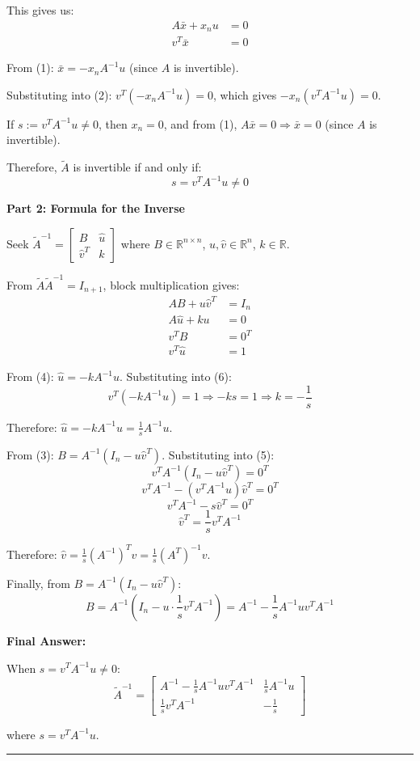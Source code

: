 This gives us:
\begin{align}
A\bar{x} + x_n u &= 0 \tag{1}\\
v^T\bar{x} &= 0 \tag{2}
\end{align}

From (1): $\bar{x} = -x_n A^{-1}u$ (since $A$ is invertible).

Substituting into (2): $v^T(-x_n A^{-1}u) = 0$, which gives $-x_n(v^T A^{-1}u) = 0$.

If $s := v^TA^{-1}u \neq 0$, then $x_n = 0$, and from (1), $A\bar{x} = 0 \Rightarrow \bar{x} = 0$ (since $A$ is invertible).

Therefore, $\tilde{A}$ is invertible if and only if:
$$\boxed{s = v^TA^{-1}u \neq 0}$$

\textbf{Part 2: Formula for the Inverse}

Seek $\tilde{A}^{-1} = \begin{bmatrix} B & \hat{u} \\ \hat{v}^T & k \end{bmatrix}$ where $B \in \mathbb{R}^{n \times n}$, $\hat{u}, \hat{v} \in \mathbb{R}^n$, $k \in \mathbb{R}$.

From $\tilde{A}\tilde{A}^{-1} = I_{n+1}$, block multiplication gives:
\begin{align}
AB + u\hat{v}^T &= I_n \tag{3}\\
A\hat{u} + ku &= 0 \tag{4}\\
v^TB &= 0^T \tag{5}\\
v^T\hat{u} &= 1 \tag{6}
\end{align}

From (4): $\hat{u} = -kA^{-1}u$. Substituting into (6):
$$v^T(-kA^{-1}u) = 1 \Rightarrow -ks = 1 \Rightarrow k = -\frac{1}{s}$$

Therefore: $\hat{u} = -kA^{-1}u = \frac{1}{s}A^{-1}u$.

From (3): $B = A^{-1}(I_n - u\hat{v}^T)$. Substituting into (5):
$$v^TA^{-1}(I_n - u\hat{v}^T) = 0^T$$
$$v^TA^{-1} - (v^TA^{-1}u)\hat{v}^T = 0^T$$
$$v^TA^{-1} - s\hat{v}^T = 0^T$$
$$\hat{v}^T = \frac{1}{s}v^TA^{-1}$$

Therefore: $\hat{v} = \frac{1}{s}(A^{-1})^Tv = \frac{1}{s}(A^T)^{-1}v$.

Finally, from $B = A^{-1}(I_n - u\hat{v}^T)$:
$$B = A^{-1}\left(I_n - u \cdot \frac{1}{s}v^TA^{-1}\right) = A^{-1} - \frac{1}{s}A^{-1}uv^TA^{-1}$$

\textbf{Final Answer:}

When $s = v^TA^{-1}u \neq 0$:
$$\boxed{\tilde{A}^{-1} = \begin{bmatrix} 
A^{-1} - \frac{1}{s}A^{-1}uv^TA^{-1} & \frac{1}{s}A^{-1}u \\
\frac{1}{s}v^TA^{-1} & -\frac{1}{s}
\end{bmatrix}}$$

where $s = v^TA^{-1}u$.

\vspace{2em}
\noindent\rule{\textwidth}{0.4pt}
